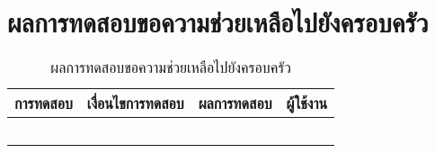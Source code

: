 \section{ผลการทดสอบขอความช่วยเหลือไปยังครอบครัว}
\begin{table}[H]
	\caption{ผลการทดสอบขอความช่วยเหลือไปยังครอบครัว}
    \centering	
	\label{tab:test23}
    \begin{tabular}{ | p{4cm} | p{4cm} | p{4cm} | p{2cm} | }
		\hline
	\multicolumn{1}{|c|}{การทดสอบ} & \multicolumn{1}{c|}{เงื่อนไขการทดสอบ} & \multicolumn{1}{c|}{ผลการทดสอบ} & \multicolumn{1}{c|}{ผู้ใช้งาน}                             \\ \hline
	\setstretch{1.0}{ทดสอบขอความช่วยเหลือไปยังครอบครัว}
	& \setstretch{1.0}{ผู้ใช้ขอความช่วยเหลือไปยังครอบครัว}
	& \setstretch{1.0}{ระบบแสดงหน้าขอความช่วยเหลือครอบครัว} 
	&\setstretch{1.0}{\begin{flushleft}ผู้ใช้งาน\end{flushleft}} \\ \cline{2-3} 
	& \setstretch{1.0}{ผู้ใช้เลือกปุ่มโทรหาสมาชิกในครอบครัว และสมาชิกมีข้อมูลเบอร์โทรศัพท์}
	& \setstretch{1.0}{ระบบจะเรียกใช้งานการโทรของมือถือผู้ใช้พร้อมกับเบอร์ของสมาชิก } 
	&\setstretch{1.0}{}\\ \cline{2-3} 
	& \setstretch{1.0}{ผู้ใช้เลือกปุ่มโทรหาสมาชิกในครอบครัว และสมาชิกไม่มีข้อมูลเบอร์โทรศัพท์}
	& \setstretch{1.0}{ระบบแสดงข้อความ  สมาชิกไม่ได้ระบุเบอร์โทรศัพท์  } 
	&\setstretch{1.0}{}\\ \cline{2-3} 
	& \setstretch{1.0}{ผู้ใช้เลือกปุ่มส่งข้อความหาสมาชิกในครอบครัว และสมาชิกมีข้อมูลเบอร์โทรศัพท์}
	& \setstretch{1.0}{ระบบจะเรียกใช้งานการส่งข้อความของมือถือผู้ใช้พร้อมกับเบอร์ของสมาชิก และข้อความขอความช่วยเหลือ } 
	&\setstretch{1.0}{}\\ \cline{2-3} 
	& \setstretch{1.0}{ผู้ใช้เลือกปุ่มส่งข้อความหาสมาชิกในครอบครัว และสมาชิกไม่มีข้อมูลเบอร์โทรศัพท์}
	& \setstretch{1.0}{ระบบแสดงข้อความ  สมาชิกไม่ได้ระบุเบอร์โทรศัพท์  } 
	&\setstretch{1.0}{}\\ \cline{2-3} \hline
    \end{tabular}
\end{table}

